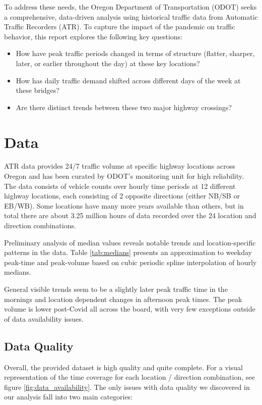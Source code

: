 \documentclass{article}
\begin{document}
To address these needs, the Oregon Department of Transportation (ODOT) seeks a comprehensive, data-driven analysis using historical traffic data from Automatic Traffic Recorders (ATR). To capture the impact of the pandemic on traffic behavior, this report explores the following key questions:

\begin{itemize}
    \item How have peak traffic periods changed in terms of structure (flatter, sharper, later, or earlier throughout the day) at these key locations?
    \item How has daily traffic demand shifted across different days of the week at these bridges?
    \item Are there distinct trends between these two major highway crossings?
\end{itemize}

\section{Data}

ATR data provides 24/7 traffic volume at specific highway locations across Oregon and has been curated by ODOT’s monitoring unit for high reliability. The data consists of vehicle counts over hourly time periods at 12 different highway locations, each consisting of 2 opposite directions (either NB/SB or EB/WB). Some locations have many more years available than others, but in total there are about 3.25 million hours of data recorded over the 24 location and direction combinations.

Preliminary analysis of median values reveals notable trends and location-specific patterns in the data. Table \ref{tab:medians} presents an approximation to weekday peak-time and peak-volume based on cubic periodic spline interpolation of hourly medians. 

General visible trends seem to be a slightly later peak traffic time in the mornings and location dependent changes in afternoon peak times. The peak volume is lower post-Covid all across the board, with very few exceptions outside of data availability issues. 

\subsection{Data Quality}
Overall, the provided dataset is high quality and quite complete. For a visual representation of the time coverage for each location / direction combination, see figure \ref{fig:data_availability}. The only issues with data quality we discovered in our analysis fall into two main categories:
\end{document}
